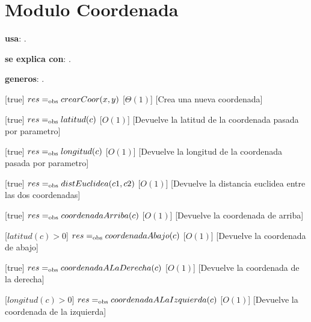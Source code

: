 \section{Modulo Coordenada}


\begin{Interfaz}

  \textbf{usa}: .

  \textbf{se explica con}: .

  \textbf{generos}: .

  [true]
  {$res =_{\mathrm{obs}} crearCoor(x, y)$}
  [$\Theta(1)$]
  [Crea una nueva coordenada]

  [true]
  {$res =_{\mathrm{obs}} latitud(c)$}
  [$O(1)$]
  [Devuelve la latitud de la coordenada pasada por parametro]

  [true]
  {$res =_{\mathrm{obs}} longitud(c)$}
  [$O(1)$]
  [Devuelve la longitud de la coordenada pasada por parametro]
  
  [true]
  {$res =_{\mathrm{obs}} distEuclidea(c1, c2)$}
  [$O(1)$]
  [Devuelve la distancia euclidea entre las dos coordenadas]
  
  [true]
  {$res =_{\mathrm{obs}} coordenadaArriba(c)$}
  [$O(1)$]
  [Devuelve la coordenada de arriba]
  
  [$latitud(c) > 0$]
  {$res =_{\mathrm{obs}} coordenadaAbajo(c)$}
  [$O(1)$]
  [Devuelve la coordenada de abajo]

  [true]
  {$res =_{\mathrm{obs}} coordenadaALaDerecha(c)$}
  [$O(1)$]
  [Devuelve la coordenada de la derecha]
  
  [$longitud(c) > 0$]
  {$res =_{\mathrm{obs}} coordenadaALaIzquierda(c)$}
  [$O(1)$]
  [Devuelve la coordenada de la izquierda]
  
\end{Interfaz}

